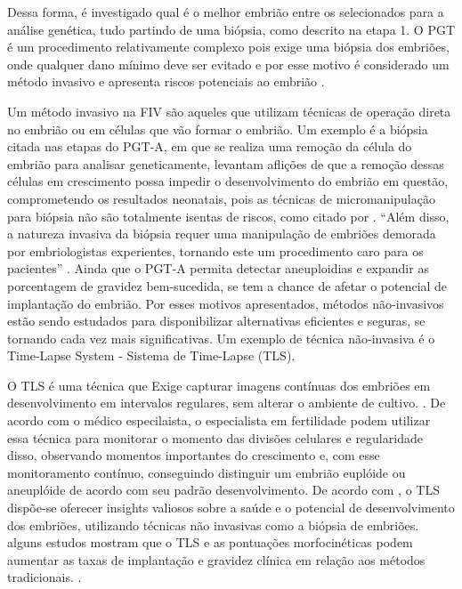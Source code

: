 Dessa forma, é investigado qual é o melhor embrião entre os selecionados para a análise genética, tudo partindo de uma biópsia, como descrito na etapa 1. O PGT é um procedimento relativamente complexo pois exige uma biópsia dos embriões, onde qualquer dano mínimo deve ser evitado e por esse motivo é considerado um método invasivo e apresenta riscos potenciais ao embrião \cite{yang2024}.

Um método invasivo na FIV são aqueles que utilizam técnicas de operação direta no embrião ou em células que vão formar o embrião. Um exemplo é a biópsia citada nas etapas do PGT-A, em que se realiza uma remoção da célula do embrião para analisar geneticamente,  levantam aflições de que a remoção dessas células em crescimento possa impedir o desenvolvimento do embrião em questão, comprometendo os resultados neonatais, pois as técnicas de micromanipulação para biópsia não são totalmente isentas de riscos, como citado por . “Além disso, a natureza invasiva da biópsia requer uma manipulação de embriões demorada por embriologistas experientes, tornando este um procedimento caro para os pacientes” \cite{phillips2024, leaver2019}. Ainda que o PGT-A permita detectar aneuploidias e expandir as porcentagem de gravidez bem-sucedida, se tem a chance de afetar o potencial de implantação do embrião. Por esses motivos apresentados, métodos não-invasivos estão sendo estudados para disponibilizar alternativas eficientes e seguras, se tornando cada vez mais significativas. Um exemplo de técnica não-invasiva é o Time-Lapse System {-} Sistema de Time-Lapse (TLS).

O TLS é uma técnica que Exige capturar imagens contínuas dos embriões em desenvolvimento em intervalos regulares, sem alterar o ambiente de cultivo. \cite{moustakli2024}. De acordo com o médico especilaista, o especialista em fertilidade podem utilizar essa técnica para monitorar o momento das divisões celulares e regularidade disso, observando momentos importantes do crescimento e, com esse monitoramento contínuo, conseguindo distinguir um embrião euplóide ou aneuplóide de acordo com seu padrão desenvolvimento. De acordo com , o TLS dispõe-se oferecer insights valiosos sobre a saúde e o potencial de desenvolvimento dos embriões, utilizando técnicas não invasivas como a biópsia de embriões. alguns estudos mostram que o TLS e as pontuações morfocinéticas podem aumentar as taxas de implantação e gravidez clínica em relação aos métodos tradicionais. \cite{boucret2021}.


